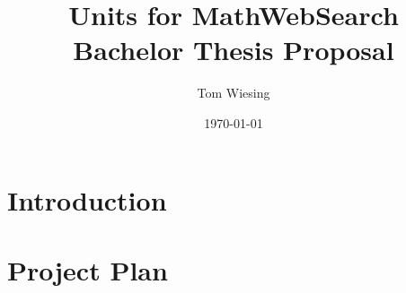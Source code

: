 \documentclass[12pt]{article}
\title{Units for MathWebSearch\ednote{Preliminary Title}\\Bachelor Thesis Proposal}
\author{Tom Wiesing}
\date{\today}
\begin{document}
\maketitle
\newpage
\tableofcontents
\section{Introduction}
\section{Project Plan}
\end{document}
